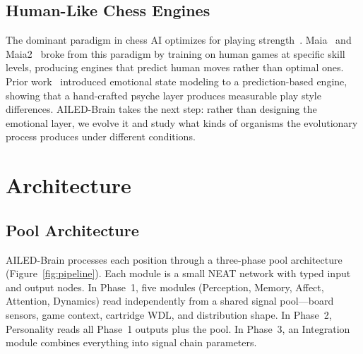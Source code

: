 \documentclass[11pt,a4paper]{article}
\begin{document}
\subsection{Human-Like Chess Engines}

The dominant paradigm in chess AI optimizes for playing strength~\citep{silver2018alphazero}.
Maia~\citep{mcilroyyoung2020maia} and Maia2~\citep{mcilroyyoung2022maia2} broke from this paradigm by training on human games at specific skill levels, producing engines that predict human moves rather than optimal ones.
Prior work~\citep{resendez2026ailed} introduced emotional state modeling to a prediction-based engine, showing that a hand-crafted psyche layer produces measurable play style differences.
AILED-Brain takes the next step: rather than designing the emotional layer, we evolve it and study what kinds of organisms the evolutionary process produces under different conditions.

\section{Architecture}

\subsection{Pool Architecture}

AILED-Brain processes each position through a three-phase pool architecture (Figure~\ref{fig:pipeline}).
Each module is a small NEAT network with typed input and output nodes.
In Phase~1, five modules (Perception, Memory, Affect, Attention, Dynamics) read independently from a shared signal pool---board sensors, game context, cartridge WDL, and distribution shape.
In Phase~2, Personality reads all Phase~1 outputs plus the pool.
In Phase~3, an Integration module combines everything into signal chain parameters.
\end{document}
